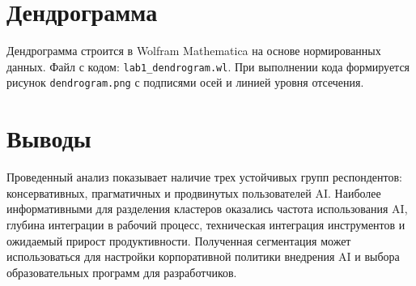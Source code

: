 \documentclass[12pt]{article}
\begin{document}
\section*{Дендрограмма}
Дендрограмма строится в Wolfram Mathematica на основе нормированных данных. Файл с кодом: \texttt{lab1\_dendrogram.wl}. При выполнении кода формируется рисунок \texttt{dendrogram.png} с подписями осей и линией уровня отсечения.

\section*{Выводы}
Проведенный анализ показывает наличие трех устойчивых групп респондентов: консервативных, прагматичных и продвинутых пользователей AI. Наиболее информативными для разделения кластеров оказались частота использования AI, глубина интеграции в рабочий процесс, техническая интеграция инструментов и ожидаемый прирост продуктивности. Полученная сегментация может использоваться для настройки корпоративной политики внедрения AI и выбора образовательных программ для разработчиков.
\end{document}
